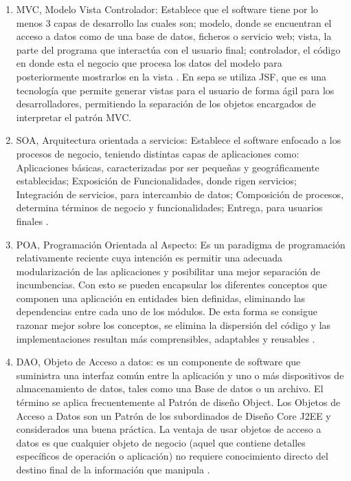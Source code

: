 \documentclass[a4paper,12pt,openany,oneside]{book}
\begin{document}
\begin{enumerate}

\item MVC, Modelo Vista Controlador: Establece que el software tiene por lo menos 3 capas de desarrollo las cuales son; modelo, donde se encuentran el acceso a datos como de una base de datos, ficheros o servicio web; vista, la parte del programa que interactúa con el usuario final; controlador, el código en donde esta el negocio que procesa los datos del modelo para posteriormente mostrarlos en la vista \cite{data22}. En sepa se utiliza JSF, que es una tecnología que permite generar vistas para el usuario de forma ágil para los desarrolladores, permitiendo la separación de los objetos encargados de interpretar el patrón MVC.

\item SOA, Arquitectura orientada a servicios: Establece el software enfocado a los procesos de negocio, teniendo distintas capas de aplicaciones como: Aplicaciones básicas, caracterizadas por ser pequeñas y geográficamente establecidas; Exposición de Funcionalidades, donde rigen servicios; Integración de servicios, para intercambio de datos; Composición de procesos, determina términos de negocio y funcionalidades; Entrega, para usuarios finales \cite{data23}.

\item POA, Programación Orientada al Aspecto: Es un paradigma de programación relativamente reciente cuya intención es permitir una adecuada modularización de las aplicaciones y posibilitar una mejor separación de incumbencias. Con esto se pueden encapsular los diferentes conceptos que componen una aplicación en entidades bien definidas, eliminando las dependencias entre cada uno de los módulos. De esta forma se consigue razonar mejor sobre los conceptos, se elimina la dispersión del código y las implementaciones resultan más comprensibles, adaptables y reusables \cite{data24}.

\item DAO, Objeto de Acceso a datos: es un componente de software que suministra una interfaz común entre la aplicación y uno o más dispositivos de almacenamiento de datos, tales como una Base de datos o un archivo. El término se aplica frecuentemente al Patrón de diseño Object. Los Objetos de Acceso a Datos son un Patrón de los subordinados de Diseño Core J2EE y considerados una buena práctica. La ventaja de usar objetos de acceso a datos es que cualquier objeto de negocio (aquel que contiene detalles específicos de operación o aplicación) no requiere conocimiento directo del destino final de la información que manipula \cite{data25}.

\end{enumerate}
\end{document}
